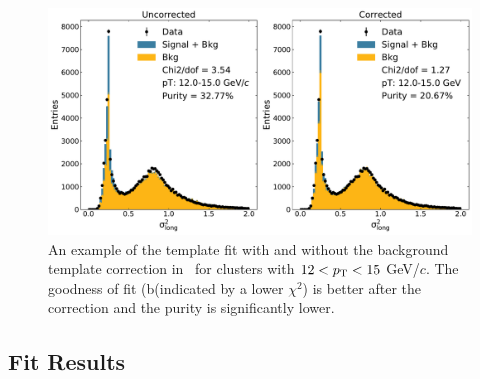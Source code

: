 
\begin{figure}
    \centering
    \includegraphics[width=0.5\textheight]{Data_Analysis/Purity/correction-example-p-Pb-cluster_Lambda-12-15.pdf}
    \caption{An example of the template fit with and without the background template correction in \pPb~for clusters with $12 < p_{\mathrm{T}} < 15$ GeV/$c$. The goodness of fit (b(indicated by a lower $\chi^2$) is better after the correction and the purity is significantly lower.}
    \label{fig:purcorrectionexample}
\end{figure}
\FloatBarrier

\subsection{Fit Results}
\label{sec:fitresults}


